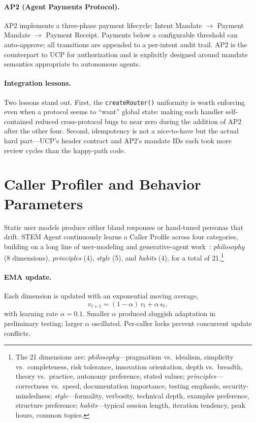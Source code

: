 \documentclass[11pt]{article}
\begin{document}
\paragraph{AP2 (Agent Payments Protocol).} AP2 implements a three-phase payment lifecycle: Intent Mandate $\rightarrow$ Payment Mandate $\rightarrow$ Payment Receipt. Payments below a configurable threshold can auto-approve; all transitions are appended to a per-intent audit trail. AP2 is the counterpart to UCP for authorization and is explicitly designed around mandate semantics appropriate to autonomous agents.

\paragraph{Integration lessons.} Two lessons stand out. First, the \texttt{createRouter()} uniformity is worth enforcing even when a protocol seems to ``want'' global state: making each handler self-contained reduced cross-protocol bugs to near zero during the addition of AP2 after the other four. Second, idempotency is not a nice-to-have but the actual hard part---UCP's header contract and AP2's mandate IDs each took more review cycles than the happy-path code.

\section{Caller Profiler and Behavior Parameters}
\label{sec:profiler}

Static user models produce either bland responses or hand-tuned personas that drift. STEM Agent continuously learns a Caller Profile across four categories, building on a long line of user-modeling and generative-agent work~\citep{park2023generative}: \emph{philosophy} (8 dimensions), \emph{principles} (4), \emph{style} (5), and \emph{habits} (4), for a total of 21.\footnote{The 21 dimensions are: \textit{philosophy}---pragmatism vs.\ idealism, simplicity vs.\ completeness, risk tolerance, innovation orientation, depth vs.\ breadth, theory vs.\ practice, autonomy preference, stated values; \textit{principles}---correctness vs.\ speed, documentation importance, testing emphasis, security-mindedness; \textit{style}---formality, verbosity, technical depth, examples preference, structure preference; \textit{habits}---typical session length, iteration tendency, peak hours, common topics.}

\paragraph{EMA update.} Each dimension is updated with an exponential moving average,
\begin{equation}
v_{t+1} = (1-\alpha)\,v_t + \alpha\,s_t,
\label{eq:ema}
\end{equation}
with learning rate $\alpha=0.1$. Smaller $\alpha$ produced sluggish adaptation in preliminary testing; larger $\alpha$ oscillated. Per-caller locks prevent concurrent update conflicts.
\end{document}
